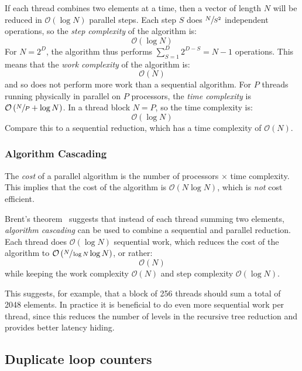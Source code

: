 If each thread combines two elements at a time, then a vector of length $N$ will
be reduced in $\mathcal{O}\left( \log N \right)$ parallel steps. Each step $S$
does $\sfrac{N}{S^2}$ independent operations, so the \emph{step
complexity} of the algorithm is:
\[
\mathcal{O}\left( \log N \right)
\]
For $N=2^{D}$, the algorithm thus performs $\sum_{S=1}^{D}2^{D-S} = N - 1$
operations. This means that the \emph{work complexity} of
the algorithm is:
\[
\mathcal{O}\left( N \right)
\]
and so does not perform more work than a sequential algorithm. For $P$ threads
running physically in parallel on $P$ processors, the \emph{time
complexity} is $\mathcal{O}\left( \sfrac{N}{P} + \log N
\right)$. In a thread block $N = P$, so the time complexity is:
\[
\mathcal{O}\left( \log N \right)
\]
Compare this to a sequential reduction, which has a time complexity of
$\mathcal{O}\left( N \right)$.

\subsubsection{Algorithm Cascading}
\label{sec:algorithm_cascading}

The \emph{cost} of a parallel algorithm is the number of processors $\times$
time complexity. This implies that the cost of the algorithm is
$\mathcal{O}\left( N \log N \right)$, which is \emph{not} cost efficient.

Brent's theorem~\cite{Chatterjee:2009vh} suggests that instead of each thread
summing two elements, \emph{algorithm cascading} can be used to combine a
sequential and parallel reduction. Each thread does $\mathcal{O}\left( \log N
\right)$ sequential work, which reduces the cost of the algorithm to
$\mathcal{O}\left( \sfrac{N}{\log N} \log N \right)$, or rather:
\[
\mathcal{O}\left( N \right)
\]
while keeping the work complexity $\mathcal{O}\left( N \right)$ and step
complexity $\mathcal{O}\left( \log N \right)$.

This suggests, for example, that a block of 256 threads should sum a total of
2048 elements. In practice it is beneficial to do even more sequential work per
thread, since this reduces the number of levels in the recursive tree reduction
and provides better latency hiding.


\subsection{Duplicate loop counters}

